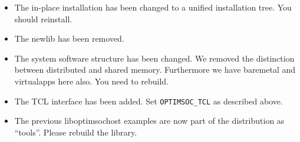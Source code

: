 \begin{itemize}
\item The in-place installation has been changed to a unified
  installation tree. You should reinstall.
\item The newlib has been removed.
\item The system software structure has been changed. We removed the
  distinction between distributed and shared memory. Furthermore we
  have baremetal and virtualapps here also. You need to rebuild.
\item The TCL interface has been added. Set \verb|OPTIMSOC_TCL| as
  described above.
\item The previous liboptimsochost examples are now part of the
  distribution as ``tools''. Please rebuild the library.
\end{itemize}